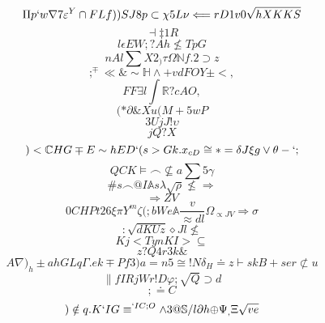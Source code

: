 \documentclass[12pt]{article}
\begin{document}
        \begin{minipage}[t][0pt]{\linewidth}

        \[\Pi p ` w\nabla 7\varepsilon^{Y}\cap F L f ) ) S J 8 p\subset\chi 5 L\nu\Longleftarrow r D 1 v 0\sqrt{hXKKS}\]
\[\dashv\ddagger 1 R\]
\[l\epsilon E W ; ? A h\nleq T p G\]
\[nAl\sum X 2_{)}\tau\Omega {\mathbb{N} f . 2}\supset z\]
\[;^{\mp}\ll\&\sim\mathbb{H}\land + v d F O Y\pm < ,\]
\[FF\exists l\int\mathbb{R} ? c A O ,\]
\[(*\partial\& X u ( M + 5 w P\]
\[3UjJ!\upsilon\]
\[jQ?X\]
\[)<\mathbb{C} H G\mp E\sim h E D ` ( s > G k . x_{cD}\cong * =\delta J\xi g\lor\theta - ` ;\]
\[QCK\models\frown\nsubseteq a\sum 5\gamma\]
\[\# s\frown @ I\mathbb{A} s\lambda\sqrt{\rho}\nleq\Rightarrow\]
\[\Rightarrow Z V\]
\[0CHPt26\xi\pi Y^{m}\zeta ( ; b W e\mathbb{A}\frac{v}{\approx d l}\Omega_{\propto J V}\Rightarrow\sigma\]
\[:\sqrt{dKUz}\diamond J l\nleq\]
\[Kj<TynKI>\subseteq\]
\[z?Q4r3k\&\]
\[A\nabla )_{h}\pm a h G L q {\Gamma . e} k\mp P f 3 ) a = n 5\cong ! N\delta_{H}\doteq z\vdash s k B + s e r\not\subset u\]
\[\parallel f I R j W r ! D\varphi ;\sqrt{Q}\supset d\]
\[;\doteq C\]
\[)\notin q . K ` I G\equiv^{`IC;O}\land 3 @\mathbb{S} / l\partial h {\oplus}\Psi_{,}\Xi\sqrt{v e}
        \]
\end{minipage}
\end{document}
